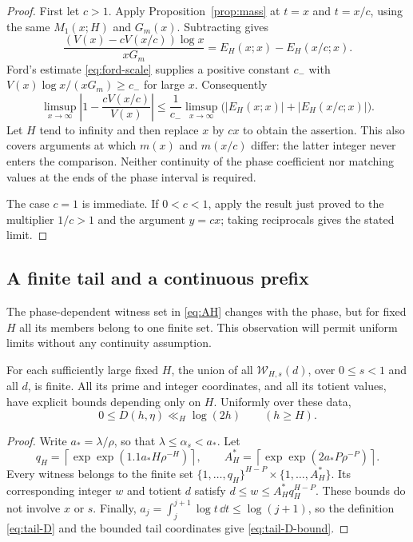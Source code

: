 \begin{proof}
First let \(c>1\). Apply Proposition~\ref{prop:mass} at \(t=x\)
and \(t=x/c\), using the same \(M_1(x;H)\) and \(G_m(x)\).
Subtracting gives
\[
 \frac{(V(x)-cV(x/c))\log x}{xG_m}
 =E_H(x;x)-E_H(x/c;x).
\]
Ford's estimate \eqref{eq:ford-scale} supplies a positive constant
\(c_-\) with \(V(x)\log x/(xG_m)\ge c_-\) for large \(x\).
Consequently
\[
 \limsup_{x\to\infty}
 \left|1-\frac{cV(x/c)}{V(x)}\right|
 \le\frac1{c_-}\limsup_{x\to\infty}
       \bigl(|E_H(x;x)|+|E_H(x/c;x)|\bigr).
\]
Let \(H\) tend to infinity and then replace \(x\) by \(cx\) to
obtain the assertion. This also covers arguments at which
\(m(x)\) and \(m(x/c)\) differ: the latter integer never enters
the comparison. Neither continuity of the phase coefficient nor
matching values at the ends of the phase interval is required.

The case \(c=1\) is immediate. If \(0<c<1\), apply the result
just proved to the multiplier \(1/c>1\) and the argument
\(y=cx\); taking reciprocals gives the stated limit.
\end{proof}

\subsection{A finite tail and a continuous prefix}

The phase-dependent witness set in \eqref{eq:AH} changes with the
phase, but for fixed $H$ all its members belong to one finite set.
This observation will permit uniform limits without any continuity
assumption.

\begin{lemma}
\label{lem:finite-tail-data}
For each sufficiently large fixed $H$, the union of all
$\mathcal W_{H,s}(d)$, over $0\le s<1$ and all $d$, is finite.
All its prime and integer coordinates, and all its totient values,
have explicit bounds depending only on $H$.  Uniformly over these
data,
\begin{equation}
 0\le D(h,\eta)\ll_H\log(2h)\qquad(h\ge H).
 \label{eq:tail-D-bound}
\end{equation}
\end{lemma}

\begin{proof}
Write $a_*=\lambda/\rho$, so that
$\lambda\le\alpha_s<a_*$.  Let
\[
 q_H=\left\lceil\exp\exp(1.1a_*H\rho^{-H})\right\rceil,
 \qquad
 A_H^*=\left\lceil\exp\exp(2a_*P\rho^{-P})\right\rceil.
\]
Every witness belongs to the finite set
$\{1,\ldots,q_H\}^{H-P}\times\{1,\ldots,A_H^*\}$.
Its corresponding integer $w$ and totient $d$ satisfy
$d\le w\le A_H^*q_H^{H-P}$.  These bounds do not involve $x$ or $s$.
Finally,
$a_j=\int_j^{j+1}\log t\,\dd t\le\log(j+1)$, so the definition
\eqref{eq:tail-D} and the bounded tail coordinates give
\eqref{eq:tail-D-bound}.
\end{proof}

